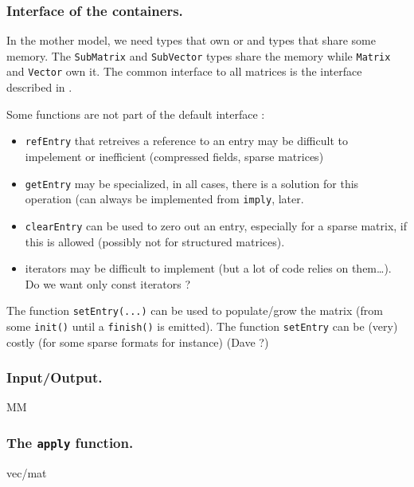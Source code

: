 \subsubsection{Interface of the containers.}
%
In the mother model, we need types that own or and types that share some
memory.  The \texttt{SubMatrix} and \texttt{SubVector} types share the memory
while \texttt{Matrix} and \texttt{Vector} own it.
%
The common interface to all matrices is the \applin  interface described in
.
%

%
\begin{remark}
%
	Some functions are not part of the default interface :
	\begin{itemize}
		\item \texttt{refEntry} that retreives a reference to an entry
			may be difficult to impelement or inefficient
			(compressed fields, sparse matrices)
		\item \texttt{getEntry} may be specialized, in all cases, there
			is a solution for this operation (can always be
			implemented from \texttt{imply}, \cf{} later.
		\item \texttt{clearEntry} can be used to zero out an entry,
			especially for a sparse matrix, if this is allowed
			(possibly not for structured matrices).
		\item iterators may be difficult to implement (but a lot of
			code relies on them\ldots). Do we want only const
			iterators ?
	\end{itemize}
%
The function \texttt{setEntry(...)} can be used to populate/grow the matrix (from some
\texttt{init()} until a \texttt{finish()} is emitted).  The function \texttt{setEntry} can be (very)
costly (for some sparse formats for instance) (Dave ?)
%
\end{remark}

\subsubsection{Input/Output.}
MM
\subsubsection{The \texttt{apply} function.}
%
vec/mat
%
